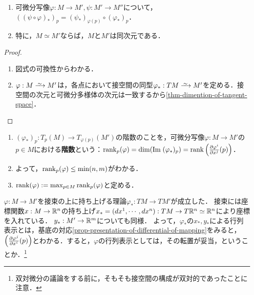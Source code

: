 \documentclass[uplatex,dvipdfmx]{jsreport}
\begin{document}
\begin{proposition}[連鎖律]\mbox{}
    \begin{enumerate}
        \item 可微分写像$\varphi:M\to M',\psi:M'\to M''$について，$((\psi\circ\varphi)_*)_p=(\psi_*)_{\varphi(p)}\circ(\varphi_*)_p$．
        \item 特に，$M\simeq M'$ならば，$M$と$M'$は同次元である．
    \end{enumerate}
\end{proposition}
\begin{proof}\mbox{}
    \begin{enumerate}
        \item 図式の可換性からわかる．
        \item $\varphi:M\iso M'$は，各点において接空間の同型$\varphi_*:TM\iso M'$を定める．接空間の次元と可微分多様体の次元は一致するから\ref{thm-dimention-of-tangent-space}．
    \end{enumerate}
\end{proof}

\begin{definition}[rank]\mbox{}
    \begin{enumerate}
        \item $(\varphi_*)_p:T_p(M)\to T_{\varphi(p)}(M')$の階数のことを，可微分写像$\varphi:M\to M'$の$p\in M$における\textbf{階数}という：$\mathrm{rank}_p(\varphi)=\dim(\mathrm{Im}\;(\varphi_*)_p)=\mathrm{rank}\left(\frac{\partial \varphi^i}{\partial x^j}(p)\right)$．
        \item よって，$\mathrm{rank}_p(\varphi)\le\min(n,m)$がわかる．
        \item $\mathrm{rank}(\varphi):=\max_{p\in M}\mathrm{rank}_p(\varphi)$と定める．
    \end{enumerate}
\end{definition}
\begin{remarks}[写像の微分の行列表示]\label{remarks-representation-of-differential}
    $\varphi:M\to M'$を接束の上に持ち上げる理論$\varphi_*:TM\to TM'$が成立した．
    接束には座標関数$x:M\to\mathbb{R}^n$の持ち上げ$x_*=(dx^1,\cdots,dx^n):TM\to T\mathbb{R}^n\simeq\mathbb{R}^n$により座標を入れている．
    $y_*:M'\to\mathbb{R}^m$についても同様．
    よって，$\varphi_*$の$x_*,y_*$による行列表示とは，基底の対応\ref{prop-presentation-of-differential-of-mapping}をみると，
    $\left(\frac{\partial \varphi^j}{\partial x^i}(p)\right)$とわかる．すると，$\varphi$の行列表示としては，その転置が妥当，ということか．\footnote{双対微分の議論をする前に，そもそも接空間の構成が双対的であったことに注意．}
\end{remarks}
\end{document}
